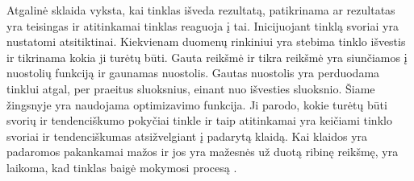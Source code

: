 \documentclass{VUMIFInfKursinis}
\begin{document}
Atgalinė sklaida vyksta, kai tinklas išveda rezultatą, patikrinama ar
rezultatas yra teisingas ir atitinkamai tinklas reaguoja į tai. Inicijuojant tinklą svoriai yra
nustatomi atsitiktinai. Kiekvienam duomenų rinkiniui yra stebima tinklo išvestis ir tikrinama kokia
ji turėtų būti. Gauta reikšmė ir tikra reikšmė yra siunčiamos į nuostolių funkciją ir gaunamas nuostolis. Gautas nuostolis yra perduodama tinklui atgal, per praeitus sluoksnius, einant nuo
išvesties sluoksnio. Šiame žingsnyje yra naudojama optimizavimo funkcija. Ji parodo, kokie turėtų būti
svorių ir tendenciškumo pokyčiai tinkle ir taip atitinkamai yra
keičiami tinklo svoriai ir tendenciškumas atsižvelgiant į padarytą klaidą. Kai klaidos
yra padaromos pakankamai mažos ir jos yra mažesnės už duotą ribinę reikšmę, yra laikoma, kad tinklas
baigė mokymosi procesą \cite{salt3}.
\end{document}

